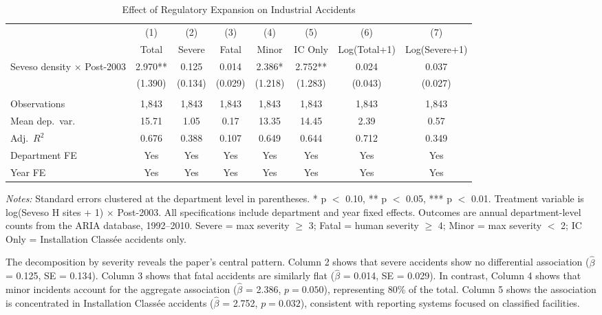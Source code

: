 \documentclass[12pt]{article}
\begin{document}
\begin{table}[H]
\centering
\caption{Effect of Regulatory Expansion on Industrial Accidents}
\label{tab:main}
\begin{adjustbox}{max width=\textwidth}
\begin{tabular}{lccccccc}
\toprule
 & (1) & (2) & (3) & (4) & (5) & (6) & (7) \\
 & Total & Severe & Fatal & Minor & IC Only & Log(Total+1) & Log(Severe+1) \\
\midrule
Seveso density $\times$ Post-2003 & 2.970** & 0.125 & 0.014 & 2.386* & 2.752** & 0.024 & 0.037 \\
 & (1.390) & (0.134) & (0.029) & (1.218) & (1.283) & (0.043) & (0.027) \\
\\
Observations & 1,843 & 1,843 & 1,843 & 1,843 & 1,843 & 1,843 & 1,843 \\
Mean dep.\ var. & 15.71 & 1.05 & 0.17 & 13.35 & 14.45 & 2.39 & 0.57 \\
Adj.\ $R^2$ & 0.676 & 0.388 & 0.107 & 0.649 & 0.644 & 0.712 & 0.349 \\
Department FE & Yes & Yes & Yes & Yes & Yes & Yes & Yes \\
Year FE & Yes & Yes & Yes & Yes & Yes & Yes & Yes \\
\bottomrule
\end{tabular}
\end{adjustbox}
\par\vspace{0.3em}
{\footnotesize \textit{Notes:} Standard errors clustered at the department level in parentheses. * p $<$ 0.10, ** p $<$ 0.05, *** p $<$ 0.01. Treatment variable is log(Seveso H sites + 1) $\times$ Post-2003. All specifications include department and year fixed effects. Outcomes are annual department-level counts from the ARIA database, 1992--2010. Severe = max severity $\geq$ 3; Fatal = human severity $\geq$ 4; Minor = max severity $<$ 2; IC Only = Installation Class\'ee accidents only.}
\end{table}

The decomposition by severity reveals the paper's central pattern. Column 2 shows that severe accidents show no differential association ($\hat{\beta}$ = 0.125, SE = 0.134). Column 3 shows that fatal accidents are similarly flat ($\hat{\beta}$ = 0.014, SE = 0.029). In contrast, Column 4 shows that minor incidents account for the aggregate association ($\hat{\beta}$ = 2.386, $p = 0.050$), representing 80\% of the total. Column 5 shows the association is concentrated in Installation Class\'ee accidents ($\hat{\beta}$ = 2.752, $p = 0.032$), consistent with reporting systems focused on classified facilities.
\end{document}

